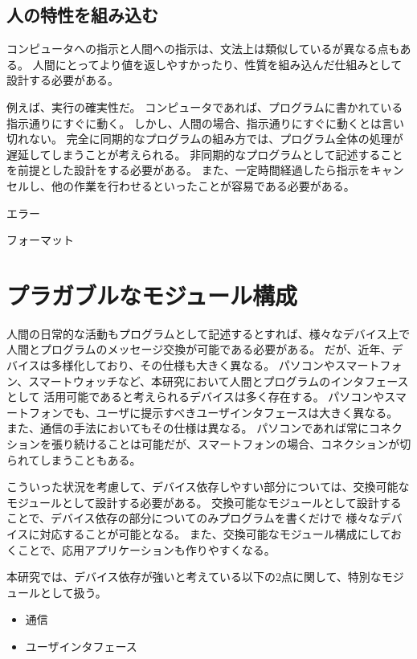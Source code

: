 \subsection{人の特性を組み込む}\label{ux4ebaux306eux7279ux6027ux3092ux7d44ux307fux8fbcux3080}

コンピュータへの指示と人間への指示は、文法上は類似しているが異なる点もある。
人間にとってより値を返しやすかったり、性質を組み込んだ仕組みとして設計する必要がある。

例えば、実行の確実性だ。
コンピュータであれば、プログラムに書かれている指示通りにすぐに動く。
しかし、人間の場合、指示通りにすぐに動くとは言い切れない。
完全に同期的なプログラムの組み方では、プログラム全体の処理が遅延してしまうことが考えられる。
非同期的なプログラムとして記述することを前提とした設計をする必要がある。
また、一定時間経過したら指示をキャンセルし、他の作業を行わせるといったことが容易である必要がある。

エラー

フォーマット

\section{プラガブルなモジュール構成}\label{sec:plaggable-module-design}

人間の日常的な活動もプログラムとして記述するとすれば、様々なデバイス上で人間とプログラムのメッセージ交換が可能である必要がある。
だが、近年、デバイスは多様化しており、その仕様も大きく異なる。
パソコンやスマートフォン、スマートウォッチなど、本研究において人間とプログラムのインタフェースとして
活用可能であると考えられるデバイスは多く存在する。
パソコンやスマートフォンでも、ユーザに提示すべきユーザインタフェースは大きく異なる。
また、通信の手法においてもその仕様は異なる。
パソコンであれば常にコネクションを張り続けることは可能だが、スマートフォンの場合、コネクションが切られてしまうこともある。

こういった状況を考慮して、デバイス依存しやすい部分については、交換可能なモジュールとして設計する必要がある。
交換可能なモジュールとして設計することで、デバイス依存の部分についてのみプログラムを書くだけで
様々なデバイスに対応することが可能となる。
また、交換可能なモジュール構成にしておくことで、応用アプリケーションも作りやすくなる。

本研究では、デバイス依存が強いと考えている以下の2点に関して、特別なモジュールとして扱う。

\begin{itemize}
\itemsep1pt\parskip0pt
\item
  通信
\item
  ユーザインタフェース
\end{itemize}

